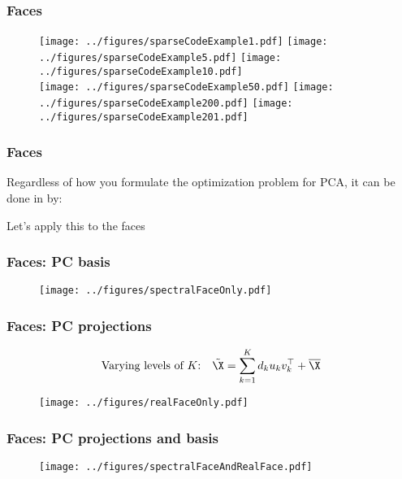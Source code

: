 \documentclass[12pt]{beamer}
\begin{document}
\begin{frame}[fragile]
\frametitle{Faces}
\begin{figure}
\centering
\texttt{[image: ../figures/sparseCodeExample1.pdf]}
\texttt{[image: ../figures/sparseCodeExample5.pdf]}
\texttt{[image: ../figures/sparseCodeExample10.pdf]} \\
\texttt{[image: ../figures/sparseCodeExample50.pdf]}
\texttt{[image: ../figures/sparseCodeExample200.pdf]}
\texttt{[image: ../figures/sparseCodeExample201.pdf]}
\end{figure}
\end{frame}

\begin{frame}[fragile]
\frametitle{Faces}
Regardless of how you formulate the optimization problem for PCA, it can be done in  by:
\vsp

Let's apply this to the faces
\end{frame}

\begin{frame}[fragile]
\frametitle{Faces: PC basis}
\begin{figure}
\centering
\texttt{[image: ../figures/spectralFaceOnly.pdf]}
\end{figure}
\end{frame}

\begin{frame}[fragile]
\frametitle{Faces: PC projections}
\[
\textrm{Varying levels of $K$:} \quad \tilde{\X} = \sum_{k=1}^K d_k u_k v_k^{\top} + \overline{\X}
\]
\begin{figure}
\centering
\texttt{[image: ../figures/realFaceOnly.pdf]}
\end{figure}
\end{frame}

\begin{frame}[fragile]
\frametitle{Faces: PC projections and basis}
\begin{figure}
\centering
\texttt{[image: ../figures/spectralFaceAndRealFace.pdf]}
\end{figure}
\end{frame}
\end{document}
